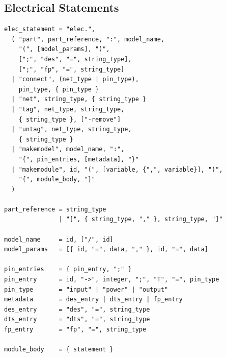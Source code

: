\subsection{Electrical Statements}
\begin{verbatim}
elec_statement = "elec.",
  ( "part", part_reference, ":", model_name,
    "(", [model_params], ")",
    [";", "des", "=", string_type],
    [";", "fp", "=", string_type]
  | "connect", (net_type | pin_type),
    pin_type, { pin_type }
  | "net", string_type, { string_type }
  | "tag", net_type, string_type,
    { string_type }, ["-remove"]
  | "untag", net_type, string_type,
    { string_type }
  | "makemodel", model_name, ":",
    "{", pin_entries, [metadata], "}"
  | "makemodule", id, "(", [variable, {",", variable}], ")",
    "{", module_body, "}"
  )

part_reference = string_type
               | "[", { string_type, "," }, string_type, "]"

model_name     = id, ["/", id]
model_params   = [{ id, "=", data, "," }, id, "=", data]

pin_entries    = { pin_entry, ";" }
pin_entry      = id, "->", integer, ";", "T", "=", pin_type
pin_type       = "input" | "power" | "output"
metadata       = des_entry | dts_entry | fp_entry
des_entry      = "des", "=", string_type
dts_entry      = "dts", "=", string_type
fp_entry       = "fp", "=", string_type

module_body    = { statement }
\end{verbatim}


